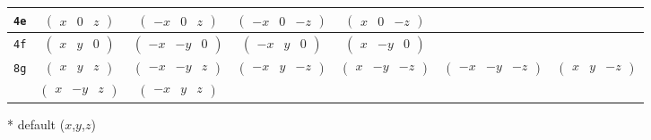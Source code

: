\documentclass[fleqn,9pt,landscape]{jsarticle}
\begin{document}
\begin{center}
\begin{longtable}{ccccccc}
{\tt 4e} & $ \begin{pmatrix} x & 0 & z \end{pmatrix} $ & $ \begin{pmatrix} - x & 0 & z \end{pmatrix} $ & $ \begin{pmatrix} - x & 0 & - z \end{pmatrix} $ & $ \begin{pmatrix} x & 0 & - z \end{pmatrix} $ & $  $ & $  $ \\ \hline
{\tt 4f} & $ \begin{pmatrix} x & y & 0 \end{pmatrix} $ & $ \begin{pmatrix} - x & - y & 0 \end{pmatrix} $ & $ \begin{pmatrix} - x & y & 0 \end{pmatrix} $ & $ \begin{pmatrix} x & - y & 0 \end{pmatrix} $ & $  $ & $  $ \\ \hline
{\tt 8g} & $ \begin{pmatrix} x & y & z \end{pmatrix} $ & $ \begin{pmatrix} - x & - y & z \end{pmatrix} $ & $ \begin{pmatrix} - x & y & - z \end{pmatrix} $ & $ \begin{pmatrix} x & - y & - z \end{pmatrix} $ & $ \begin{pmatrix} - x & - y & - z \end{pmatrix} $ & $ \begin{pmatrix} x & y & - z \end{pmatrix} $ \\
& $ \begin{pmatrix} x & - y & z \end{pmatrix} $ & $ \begin{pmatrix} - x & y & z \end{pmatrix} $ & $  $ & $  $ & $  $ & $  $ \\
\end{longtable}
\end{center}
* default ($x$,$y$,$z$)
\end{document}
